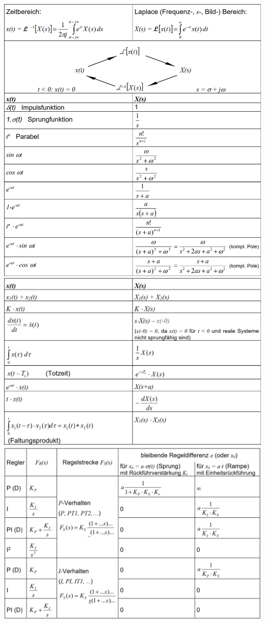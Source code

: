 \onecolumn
\centering
\includegraphics[width=0.85\columnwidth]{Figures/Laplace_1.PNG}
\includegraphics[width=0.85\columnwidth]{Figures/Laplace_2.PNG}
\includegraphics[width=1\columnwidth]{Figures/Reglerfestlegen.PNG}